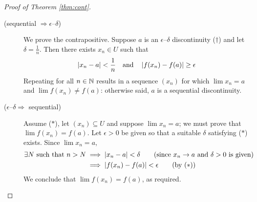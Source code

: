 \begin{proof}[Proof of Theorem \ref{thm:cont}]
\begin{description}
\item[\normalfont(sequential $\Rightarrow\epsilon$--$\delta$)] We prove the contrapositive. Suppose $a$ is an $\epsilon$--$\delta$ discontinuity ($\dag$) and let $\delta=\frac 1n$. Then there exists $x_n\in U$ such that
	\[\left| x_n-a\right|<\frac 1n\quad\text{and}\quad \left| f(x_n)-f(a)\right|\ge\epsilon\]
	Repeating for all $n\in\mathbb{N}$ results in a sequence $(x_n)$ for which $\lim x_n=a$ and $\lim f(x_n)\neq f(a)$: otherwise said, $a$ is a sequential discontinuity.
	
	\item[\normalfont($\epsilon$--$\delta\Rightarrow$ sequential)] Assume ($\ast$), let $(x_n)\subseteq U$ and suppose $\lim x_n=a$; we must prove that $\lim f(x_n)=f(a)$. Let $\epsilon>0$ be given so that a suitable $\delta$ satisfying ($\ast$) exists. Since $\lim x_n=a$,
	\begin{align*}
		\exists N\text{ such that }n>N&\implies \left| x_n-a\right|<\delta\tag{since $x_n\to a$ and $\delta>0$ is given}\\
		&\implies\left| f(x_n)-f(a)\right|<\epsilon\tag{by ($\ast$)}
	\end{align*}
	We conclude that $\lim f(x_n)=f(a)$, as required.\qedhere
\end{description}
\end{proof}

\goodbreak



